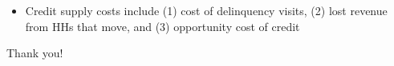 \documentclass[aspectratio=149]{beamer}
\newcommand\Wider[2][3em]{%
\makebox[\linewidth][c]{%
  \begin{minipage}{\dimexpr\textwidth+#1\relax}
  \raggedright#2
  \end{minipage}%
  }%
}
\begin{document}
\begin{frame}
{} %


\begin{itemize}
   \item Credit supply costs include (1) cost of delinquency visits, (2) lost revenue from HHs that move, and (3) opportunity cost of credit
\end{itemize}

\end{frame}



\begin{frame}


\vspace{2mm}
Thank you!

\end{frame}







\end{document}
